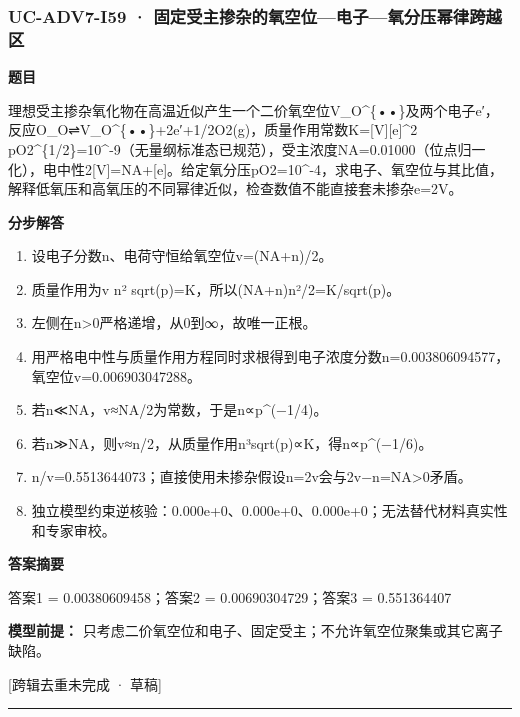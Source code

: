 \documentclass[UTF8,11pt,a4paper]{ctexart}
\begin{document}
\subsubsection*{UC-ADV7-I59 · 固定受主掺杂的氧空位—电子—氧分压幂律跨越区}
\noindent\textbf{题目}\par
理想受主掺杂氧化物在高温近似产生一个二价氧空位V\_O\textasciicircum{}\{••\}及两个电子e′，反应O\_O⇌V\_O\textasciicircum{}\{••\}+2e′+1/2O2(g)，质量作用常数K=[V][e]\textasciicircum{}2 pO2\textasciicircum{}\{1/2\}=10\textasciicircum{}-9（无量纲标准态已规范），受主浓度NA=0.01000（位点归一化），电中性2[V]=NA+[e]。给定氧分压pO2=10\textasciicircum{}-4，求电子、氧空位与其比值，解释低氧压和高氧压的不同幂律近似，检查数值不能直接套未掺杂e=2V。\par
\medskip\noindent\textbf{分步解答}
\begin{enumerate}
\item 设电子分数n、电荷守恒给氧空位v=(NA+n)/2。
\item 质量作用为v n² sqrt(p)=K，所以(NA+n)n²/2=K/sqrt(p)。
\item 左侧在n>0严格递增，从0到∞，故唯一正根。
\item 用严格电中性与质量作用方程同时求根得到电子浓度分数n=0.003806094577，氧空位v=0.006903047288。
\item 若n≪NA，v≈NA/2为常数，于是n∝p\textasciicircum{}(−1/4)。
\item 若n≫NA，则v≈n/2，从质量作用n³sqrt(p)∝K，得n∝p\textasciicircum{}(−1/6)。
\item n/v=0.5513644073；直接使用未掺杂假设n=2v会与2v−n=NA>0矛盾。
\item 独立模型约束逆核验：0.000e+0、0.000e+0、0.000e+0；无法替代材料真实性和专家审校。
\end{enumerate}
\noindent\textbf{答案摘要}\par
答案1 = 0.00380609458；答案2 = 0.00690304729；答案3 = 0.551364407\par
\noindent\textbf{模型前提：}
只考虑二价氧空位和电子、固定受主；不允许氧空位聚集或其它离子缺陷。\par
\noindent\textcolor{red!65!black}{[跨辑去重未完成 · 草稿]} \par
\medskip\hrule\medskip
{}
\end{document}
